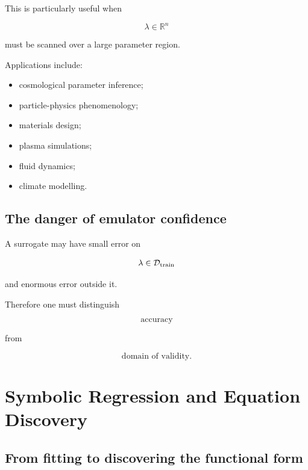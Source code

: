 \documentclass[11pt,a4paper,oneside]{book}
\newcommand{\R}{\mathbb{R}}
\begin{document}
This is particularly useful when

\begin{equation}
\lambda\in\R^n
\end{equation}

must be scanned over a large parameter region.

Applications include:

\begin{itemize}
\item cosmological parameter inference;
\item particle-physics phenomenology;
\item materials design;
\item plasma simulations;
\item fluid dynamics;
\item climate modelling.
\end{itemize}

\section{The danger of emulator confidence}

A surrogate may have small error on

\begin{equation}
\lambda\in\mathcal{D}_{\rm train}
\end{equation}

and enormous error outside it.

Therefore one must distinguish

\begin{equation}
\text{accuracy}
\end{equation}

from

\begin{equation}
\text{domain of validity}.
\end{equation}

\chapter{Symbolic Regression and Equation Discovery}

\section{From fitting to discovering the functional form}
\end{document}
